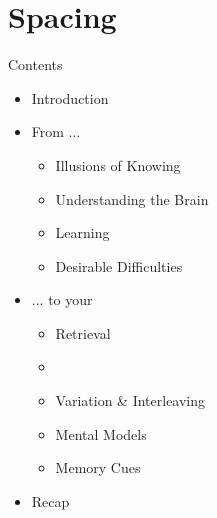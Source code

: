 \documentclass{ercisbeamer}
\begin{document}
\section{Spacing}
\begin{frame}{Contents}
    \begin{itemize}
        \item Introduction
        \item From ...
        \begin{itemize}
            \item Illusions of Knowing
            \item Understanding the Brain
            \item Learning
            \item Desirable Difficulties
        \end{itemize}
        \item ... to your 
        \begin{itemize}
            \item Retrieval
            \item {}
            \item Variation \& Interleaving
            \item Mental Models
            \item Memory Cues
        \end{itemize}
        \item Recap
    \end{itemize}
\end{frame}
\end{document}
